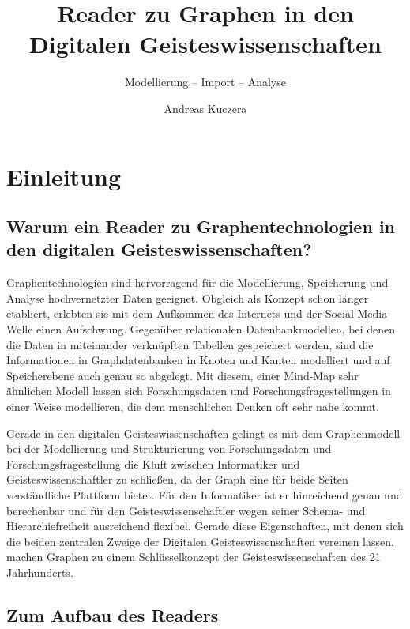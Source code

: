 \documentclass[ngerman,]{scrreprt}
\title{Reader zu Graphen in den Digitalen Geisteswissenschaften}
\subtitle{Modellierung -- Import -- Analyse}
\author{Andreas Kuczera}
\date{}
\begin{document}
\maketitle

{
\hypersetup{linkcolor=}
\setcounter{tocdepth}{2}
\tableofcontents
}
\hypertarget{einleitung}{%
\chapter{Einleitung}\label{einleitung}}

\hypertarget{warum-ein-reader-zu-graphentechnologien-in-den-digitalen-geisteswissenschaften}{%
\section{Warum ein Reader zu Graphentechnologien in den digitalen Geisteswissenschaften?}\label{warum-ein-reader-zu-graphentechnologien-in-den-digitalen-geisteswissenschaften}}

Graphentechnologien sind hervorragend für die Modellierung, Speicherung und Analyse hochvernetzter Daten geeignet. Obgleich als Konzept schon länger etabliert, erlebten sie mit dem Aufkommen des Internets und der Social-Media-Welle einen Aufschwung. Gegenüber relationalen Datenbankmodellen, bei denen die Daten in miteinander verknüpften Tabellen gespeichert werden, sind die Informationen in Graphdatenbanken in Knoten und Kanten modelliert und auf Speicherebene auch genau so abgelegt. Mit diesem, einer Mind-Map sehr ähnlichen Modell lassen sich Forschungsdaten und Forschungsfragestellungen in einer Weise modellieren, die dem menschlichen Denken oft sehr nahe kommt.

Gerade in den digitalen Geisteswissenschaften gelingt es mit dem Graphenmodell bei der Modellierung und Strukturierung von Forschungsdaten und Forschungsfragestellung die Kluft zwischen Informatiker und Geisteswissenschaftler zu schließen, da der Graph eine für beide Seiten verständliche Plattform bietet. Für den Informatiker ist er hinreichend genau und berechenbar und für den Geisteswissenschaftler wegen seiner Schema- und Hierarchiefreiheit ausreichend flexibel. Gerade diese Eigenschaften, mit denen sich die beiden zentralen Zweige der Digitalen Geisteswissenschaften vereinen lassen, machen Graphen zu einem Schlüsselkonzept der Geisteswissenschaften des 21 Jahrhunderts.

\hypertarget{zum-aufbau-des-readers}{%
\section{Zum Aufbau des Readers}\label{zum-aufbau-des-readers}}
\end{document}
